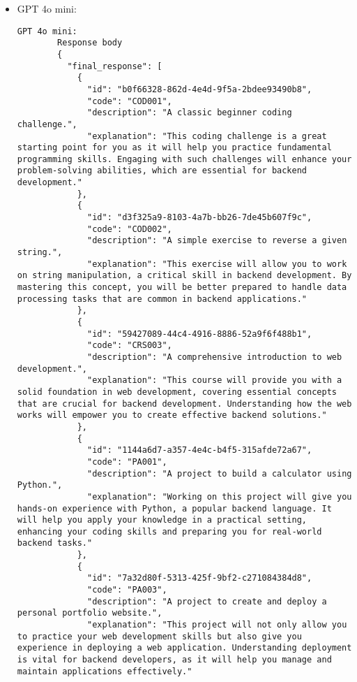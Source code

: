 \begin{itemize}
    \item GPT 4o mini:
    \begin{lstlisting}[breaklines=true]
        GPT 4o mini:
        Response body
        {
          "final_response": [
            {
              "id": "b0f66328-862d-4e4d-9f5a-2bdee93490b8",
              "code": "COD001",
              "description": "A classic beginner coding challenge.",
              "explanation": "This coding challenge is a great starting point for you as it will help you practice fundamental programming skills. Engaging with such challenges will enhance your problem-solving abilities, which are essential for backend development."
            },
            {
              "id": "d3f325a9-8103-4a7b-bb26-7de45b607f9c",
              "code": "COD002",
              "description": "A simple exercise to reverse a given string.",
              "explanation": "This exercise will allow you to work on string manipulation, a critical skill in backend development. By mastering this concept, you will be better prepared to handle data processing tasks that are common in backend applications."
            },
            {
              "id": "59427089-44c4-4916-8886-52a9f6f488b1",
              "code": "CRS003",
              "description": "A comprehensive introduction to web development.",
              "explanation": "This course will provide you with a solid foundation in web development, covering essential concepts that are crucial for backend development. Understanding how the web works will empower you to create effective backend solutions."
            },
            {
              "id": "1144a6d7-a357-4e4c-b4f5-315afde72a67",
              "code": "PA001",
              "description": "A project to build a calculator using Python.",
              "explanation": "Working on this project will give you hands-on experience with Python, a popular backend language. It will help you apply your knowledge in a practical setting, enhancing your coding skills and preparing you for real-world backend tasks."
            },
            {
              "id": "7a32d80f-5313-425f-9bf2-c271084384d8",
              "code": "PA003",
              "description": "A project to create and deploy a personal portfolio website.",
              "explanation": "This project will not only allow you to practice your web development skills but also give you experience in deploying a web application. Understanding deployment is vital for backend developers, as it will help you manage and maintain applications effectively."

\end{lstlisting}
\end{itemize}
